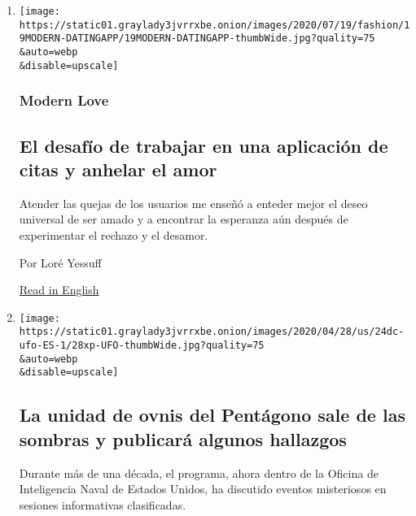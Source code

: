 \begin{enumerate}
\def\labelenumi{\arabic{enumi}.}
\item
  \href{/es/2020/07/26/espanol/estilos-de-vida/citas-en-linea-amor.html}{}

  \texttt{[image: https://static01.graylady3jvrrxbe.onion/images/2020/07/19/fashion/19MODERN-DATINGAPP/19MODERN-DATINGAPP-thumbWide.jpg?quality=75\\\&auto=webp\\\&disable=upscale]}

  \hypertarget{modern-love}{%
  \subsubsection{Modern Love}\label{modern-love}}

  \hypertarget{el-desafuxedo-de-trabajar-en-una-aplicaciuxf3n-de-citas-y-anhelar-el-amor}{%
  \subsection{El desafío de trabajar en una aplicación de citas y
  anhelar el
  amor}\label{el-desafuxedo-de-trabajar-en-una-aplicaciuxf3n-de-citas-y-anhelar-el-amor}}

  Atender las quejas de los usuarios me enseñó a enteder mejor el deseo
  universal de ser amado y a encontrar la esperanza aún después de
  experimentar el rechazo y el desamor.

  Por Loré Yessuff

  \href{https://www.nytimes3xbfgragh.onion/2020/07/17/style/modern-love-feel-love-worthy-working-for-dating-app.html}{Read
  in English}
\item
  \href{/es/2020/07/24/espanol/ovnis-pentagono.html}{}

  \texttt{[image: https://static01.graylady3jvrrxbe.onion/images/2020/04/28/us/24dc-ufo-ES-1/28xp-UFO-thumbWide.jpg?quality=75\\\&auto=webp\\\&disable=upscale]}

  \hypertarget{la-unidad-de-ovnis-del-pentuxe1gono-sale-de-las-sombras-y-publicaruxe1-algunos-hallazgos}{%
  \subsection{La unidad de ovnis del Pentágono sale de las sombras y
  publicará algunos
  hallazgos}\label{la-unidad-de-ovnis-del-pentuxe1gono-sale-de-las-sombras-y-publicaruxe1-algunos-hallazgos}}

  Durante más de una década, el programa, ahora dentro de la Oficina de
  Inteligencia Naval de Estados Unidos, ha discutido eventos misteriosos
  en sesiones informativas clasificadas.


\end{enumerate}
